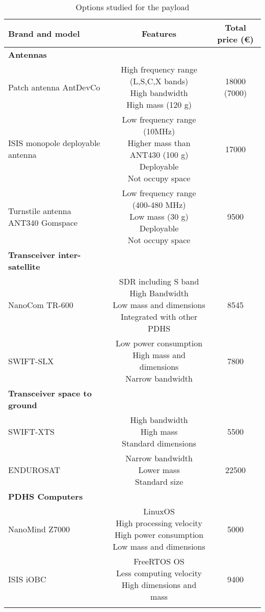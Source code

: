 \pagebreak
\begin{longtable}{| p{5cm} | c | c | }
\hline
\rowcolor[gray]{0.80}	\textbf{Brand and model} &  \textbf{Features}     & \textbf{Total price (\euro)}   \\
\hline
\endfirsthead

\rowcolor[gray]{0.85} \textbf{Antennas} &  &  \\
	   Patch antenna AntDevCo & \makecell{High frequency range (L,S,C,X bands)\\ High bandwidth \\High mass (120 g)} & 18000 (7000) \\
	   \hline
	  ISIS monopole deployable antenna & \makecell{Low frequency range (10MHz) \\ Higher mass than ANT430 (100 g) \\ Deployable \\ Not occupy space} & 17000 \\
	   \hline
	  Turnstile antenna ANT340 Gomspace & \makecell{Low frequency range (400-480 MHz) \\ Low mass (30 g) \\ Deployable \\ Not occupy space} & 9500 \\
	   \hline
	\hline

\rowcolor[gray]{0.85} \textbf{Transceiver inter-satellite} &  &  \\
	   NanoCom TR-600 & \makecell{SDR including S band\\ High Bandwidth \\ Low mass and dimensions\\Integrated with other PDHS} & 8545 \\
	   \hline
	   SWIFT-SLX & \makecell{Low power consumption\\ High mass and dimensions\\ Narrow bandwidth} & 7800 \\
	   \hline
	\hline
\rowcolor[gray]{0.85} \textbf{Transceiver space to ground} &  &  \\
		SWIFT-XTS & \makecell{High bandwidth\\ High mass \\ Standard dimensions} & 5500 \\
	   \hline
		ENDUROSAT & \makecell{Narrow bandwidth\\ Lower mass\\ Standard size} & 22500 \\
\hline
\hline
\rowcolor[gray]{0.85} \textbf{PDHS Computers} &  &  \\
		NanoMind Z7000 & \makecell{LinuxOS\\ High processing velocity\\ High power consumption\\ Low mass and dimensions} & 5000 \\
\hline
		ISIS iOBC& \makecell{FreeRTOS OS\\ Less computing velocity \\ High dimensions and mass} & 9400 \\
\hline
\hline
	
\caption{Options studied for the payload}
\label{payloadoptions}
\end{longtable}

